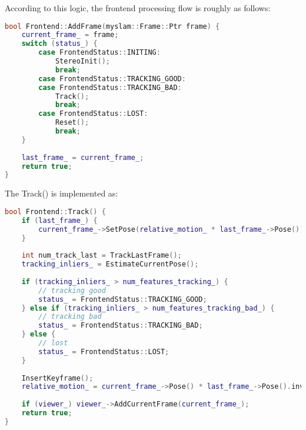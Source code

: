 According to this logic, the frontend processing flow is roughly as follows:
\begin{lstlisting}[language=c++,caption=slambook2/ch13/src/frontend.cpp]
bool Frontend::AddFrame(myslam::Frame::Ptr frame) {
	current_frame_ = frame;
	switch (status_) {
		case FrontendStatus::INITING:
			StereoInit();
			break;
		case FrontendStatus::TRACKING_GOOD:
		case FrontendStatus::TRACKING_BAD:
			Track();
			break;
		case FrontendStatus::LOST:
			Reset();
			break;
	}
	
	last_frame_ = current_frame_;
	return true;
}
\end{lstlisting}

The Track() is implemented as:
\begin{lstlisting}[language=c++,caption=slambook2/ch13/src/frontend.cpp]
bool Frontend::Track() {
	if (last_frame_) {
		current_frame_->SetPose(relative_motion_ * last_frame_->Pose());
	}
	
	int num_track_last = TrackLastFrame();
	tracking_inliers_ = EstimateCurrentPose();
	
	if (tracking_inliers_ > num_features_tracking_) {
		// tracking good
		status_ = FrontendStatus::TRACKING_GOOD;
	} else if (tracking_inliers_ > num_features_tracking_bad_) {
		// tracking bad
		status_ = FrontendStatus::TRACKING_BAD;
	} else {
		// lost
		status_ = FrontendStatus::LOST;
	}
	
	InsertKeyframe();
	relative_motion_ = current_frame_->Pose() * last_frame_->Pose().inverse();
	
	if (viewer_) viewer_->AddCurrentFrame(current_frame_);
	return true;
}
\end{lstlisting}

